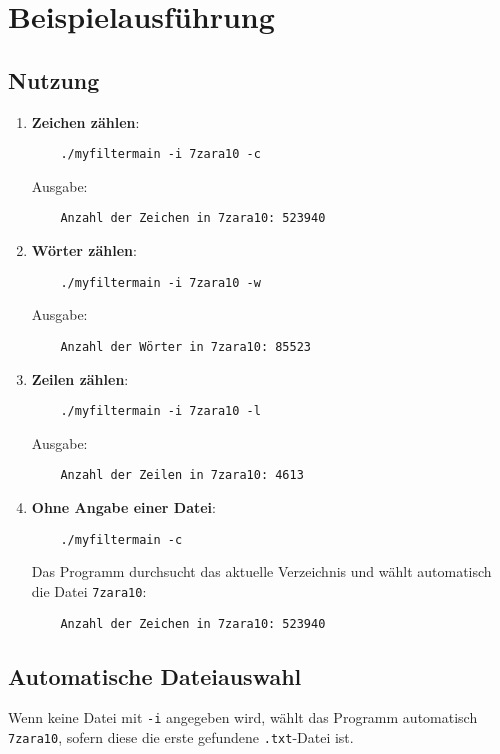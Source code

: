 \documentclass[10pt]{article} %
\begin{document}
\section{Beispielausführung}
\subsection{Nutzung}
\begin{enumerate}
    \item \textbf{Zeichen zählen}:
    \begin{verbatim}
    ./myfiltermain -i 7zara10 -c
    \end{verbatim}
    Ausgabe:
    \begin{verbatim}
    Anzahl der Zeichen in 7zara10: 523940
    \end{verbatim}

    \item \textbf{Wörter zählen}:
    \begin{verbatim}
    ./myfiltermain -i 7zara10 -w
    \end{verbatim}
    Ausgabe:
    \begin{verbatim}
    Anzahl der Wörter in 7zara10: 85523
    \end{verbatim}

    \item \textbf{Zeilen zählen}:
    \begin{verbatim}
    ./myfiltermain -i 7zara10 -l
    \end{verbatim}
    Ausgabe:
    \begin{verbatim}
    Anzahl der Zeilen in 7zara10: 4613
    \end{verbatim}

    \item \textbf{Ohne Angabe einer Datei}:
    \begin{verbatim}
    ./myfiltermain -c
    \end{verbatim}
    Das Programm durchsucht das aktuelle Verzeichnis und wählt automatisch die Datei \texttt{7zara10}:
    \begin{verbatim}
    Anzahl der Zeichen in 7zara10: 523940
    \end{verbatim}
\end{enumerate}

\subsection{Automatische Dateiauswahl}
Wenn keine Datei mit \texttt{-i} angegeben wird, wählt das Programm automatisch \texttt{7zara10}, sofern diese die erste gefundene \texttt{.txt}-Datei ist.
\end{document}
